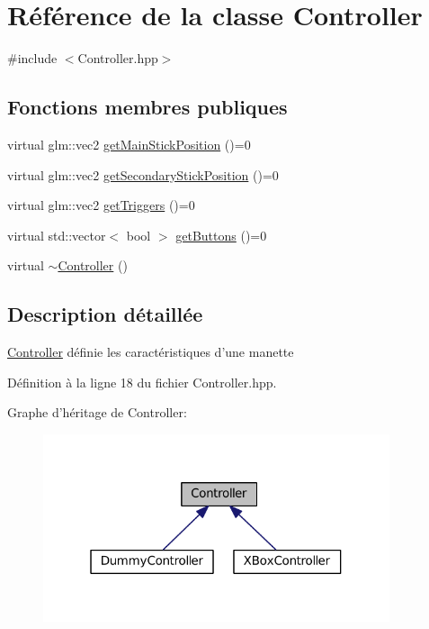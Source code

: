 \hypertarget{classController}{\section{Référence de la classe Controller}
\label{classController}
}


{\ttfamily \#include $<$Controller.\+hpp$>$}

\subsection*{Fonctions membres publiques}
\begin{DoxyCompactItemize}
\item 
virtual glm\+::vec2 \hyperlink{classController_a7436ccdad4f8dae40d61bf47b262191b}{get\+Main\+Stick\+Position} ()=0
\item 
virtual glm\+::vec2 \hyperlink{classController_ad48cb8e46282bdb3f7cd1178944eb45c}{get\+Secondary\+Stick\+Position} ()=0
\item 
virtual glm\+::vec2 \hyperlink{classController_ad98f33e8f7dfe9015eb8883d3881e373}{get\+Triggers} ()=0
\item 
virtual std\+::vector$<$ bool $>$ \hyperlink{classController_af7483fe863ff38bd2e9617771c450931}{get\+Buttons} ()=0
\item 
virtual \hyperlink{classController_a867c1b386aa6e63d986a01ddaeccea5a}{$\sim$\+Controller} ()
\end{DoxyCompactItemize}


\subsection{Description détaillée}
\hyperlink{classController}{Controller} définie les caractéristiques d'une manette 

Définition à la ligne 18 du fichier Controller.\+hpp.



Graphe d'héritage de Controller\+:
\nopagebreak
\begin{figure}[H]
\begin{center}
\leavevmode
\includegraphics[width=289pt]{classController__inherit__graph}
\end{center}
\end{figure}


